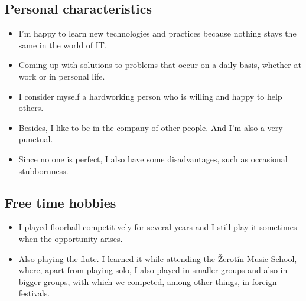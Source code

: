 \documentclass{article}
\begin{document}
\subsection*{Personal characteristics}

\begin{itemize}
	\item I'm happy to learn new technologies and practices because nothing stays the same in the world of IT.
	\item Coming up with solutions to problems that occur on a daily basis, whether at work or in personal life.
	\item I consider myself a hardworking person who is willing and happy to help others.
	\item Besides, I like to be in the company of other people. And I'm also a very punctual.
	\item Since no one is perfect, I also have some disadvantages, such as occasional stubbornness.
\end{itemize}

\subsection*{Free time hobbies}

\begin{itemize}
	\item I played floorball competitively for several years and I still play it sometimes when the opportunity arises.
	\item Also playing the flute. I learned it while attending the \href{https://www.zus-zerotin.cz/}{Žerotín Music School}, where, apart from playing solo, I also played in smaller groups and also in bigger groups, with which we competed, among other things, in foreign festivals.
\end{itemize}
\end{document}
